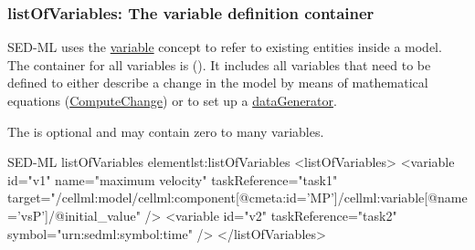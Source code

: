   \subsubsection{listOfVariables: The variable definition container}
\label{sec:listOfVariables}

SED-ML uses the \hyperref[class:variable]{variable} concept to refer to existing entities inside a model. The container for all variables is   (). It includes all variables that need to be defined to either describe a change in the model by means of mathematical equations (\hyperref[class:computeChange]{ComputeChange}) or to set up a \hyperref[class:dataGenerator]{dataGenerator}.

%

 The  is optional and may contain zero to many variables. 
%
\begin{myXmlLst}{SED-ML listOfVariables element}{lst:listOfVariables}
<listOfVariables>
 <variable id="v1" name="maximum velocity" taskReference="task1" 
     target="/cellml:model/cellml:component[@cmeta:id='MP']/cellml:variable[@name='vsP']/@initial_value" />
 <variable id="v2" taskReference="task2" symbol="urn:sedml:symbol:time" />
</listOfVariables>
\end{myXmlLst}
%
